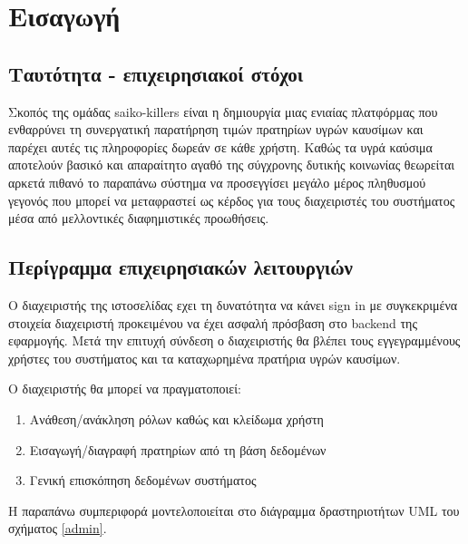 \section{Εισαγωγή}

\subsection{Ταυτότητα - επιχειρησιακοί στόχοι}

Σκοπός της ομάδας saiko-killers είναι η δημιουργία μιας ενιαίας πλατφόρμας που ενθαρρύνει τη συνεργατική παρατήρηση τιμών πρατηρίων υγρών καυσίμων και παρέχει αυτές τις πληροφορίες δωρεάν σε κάθε χρήστη. Καθώς τα υγρά καύσιμα αποτελούν βασικό και απαραίτητο αγαθό της σύγχρονης δυτικής κοινωνίας θεωρείται αρκετά πιθανό το παραπάνω σύστημα να προσεγγίσει μεγάλο μέρος πληθυσμού γεγονός που μπορεί να μεταφραστεί ως κέρδος για τους διαχειριστές του συστήματος μέσα από μελλοντικές διαφημιστικές προωθήσεις.

\subsection{Περίγραμμα επιχειρησιακών λειτουργιών}

Ο διαχειριστής της ιστοσελίδας εχει τη δυνατότητα να κάνει sign in με συγκεκριμένα στοιχεία διαχειριστή προκειμένου να έχει ασφαλή πρόσβαση στο backend της εφαρμογής.
Μετά την επιτυχή σύνδεση ο διαχειριστής θα βλέπει τους εγγεγραμμένους χρήστες του συστήματος και τα καταχωρημένα πρατήρια υγρών καυσίμων.

Ο διαχειριστής θα μπορεί να πραγματοποιεί: 
\begin{enumerate}
	\item Ανάθεση/ανάκληση ρόλων καθώς και κλείδωμα χρήστη
	\item Εισαγωγή/διαγραφή πρατηρίων από τη βάση δεδομένων
	\item Γενική επισκόπηση δεδομένων συστήματος
	
\end{enumerate}

Η παραπάνω συμπεριφορά μοντελοποιείται στο διάγραμμα δραστηριοτήτων UML του σχήματος  \ref{admin}.

